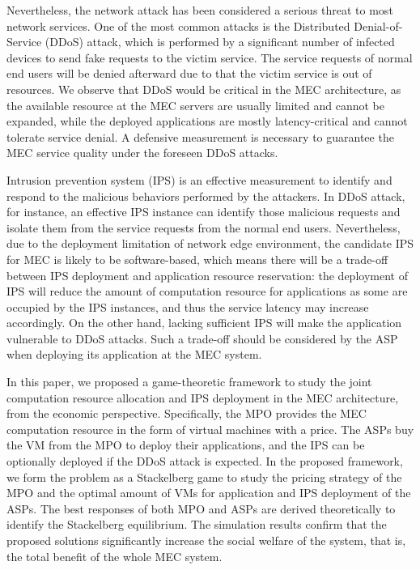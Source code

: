 \documentclass[conference]{IEEEtran}
\begin{document}
Nevertheless, the network attack has been considered a serious threat to most network services. One of the most common attacks is the Distributed Denial-of-Service (DDoS) attack, which is performed by a significant number of infected devices to send fake requests to the victim service. The service requests of normal end users will be denied afterward due to that the victim service is out of resources. We observe that DDoS would be critical in the MEC architecture, as the available resource at the MEC servers are usually limited and cannot be expanded, while the deployed applications are mostly latency-critical and cannot tolerate service denial. A defensive measurement is necessary to guarantee the MEC service quality under the foreseen DDoS attacks.

Intrusion prevention system (IPS) is an effective measurement to identify and respond to the malicious behaviors performed by the attackers. In DDoS attack, for instance, an effective IPS instance can identify those malicious requests and isolate them from the service requests from the normal end users. Nevertheless, due to the deployment limitation of network edge environment, the candidate IPS for MEC is likely to be software-based, which means there will be a trade-off between IPS deployment and application resource reservation: the deployment of IPS will reduce the amount of computation resource for applications as some are occupied by the IPS instances, and thus the service latency may increase accordingly. On the other hand, lacking sufficient IPS will make the application vulnerable to DDoS attacks. Such a trade-off should be considered by the ASP when deploying its application at the MEC system. 

In this paper, we proposed a game-theoretic framework to study the joint computation resource allocation and IPS deployment in the MEC architecture, from the economic perspective. Specifically, the MPO provides the MEC computation resource in the form of virtual machines with a price. The ASPs buy the VM from the MPO to deploy their applications, and the IPS can be optionally deployed if the DDoS attack is expected. In the proposed framework, we form the problem as a Stackelberg game to study the pricing strategy of the MPO and the optimal amount of VMs for application and IPS deployment of the ASPs. The best responses of both MPO and ASPs are derived theoretically to identify the Stackelberg equilibrium. The simulation results confirm that the proposed solutions significantly increase the social welfare of the system, that is, the total benefit of the whole MEC system.
\end{document}
